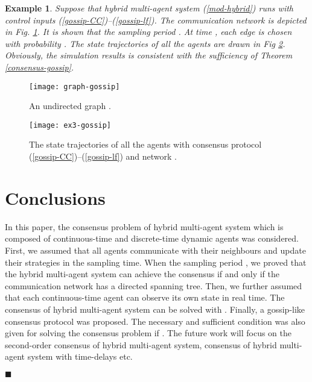 \documentclass[12pt,draftcls,onecolumn]{IEEEtran}
\newtheorem{example}{Example}
\newcommand*{\QEDA}{\hfill\ensuremath{\blacksquare}}
\begin{document}
\begin{example}\label{ex3}
Suppose that hybrid multi-agent system (\ref{mod-hybrid}) runs with control inputs (\ref{gossip-CC})--(\ref{gossip-lf}). The communication network is depicted in Fig. \ref{graph-ex3}. It is shown that the sampling period . At time , each edge  is chosen with probability . The state trajectories of all the agents are drawn in Fig \ref{result-ex3}. Obviously, the simulation results is consistent with  the sufficiency of Theorem \ref{consensus-gossip}.
\end{example}

\begin{figure}[htbp]
  \centering
\texttt{[image: graph-gossip]}\\
  \caption{An undirected graph .}\label{graph-ex3}
\end{figure}

\begin{figure}[htbp]
  \centering
\texttt{[image: ex3-gossip]}\\
  \caption{The state trajectories of all the agents with consensus protocol (\ref{gossip-CC})--(\ref{gossip-lf}) and network .}\label{result-ex3}
\end{figure}


\section{Conclusions}\label{s-Conclusion}

In this paper, the consensus problem of hybrid multi-agent system which is composed of continuous-time and discrete-time dynamic agents was considered. First, we assumed that  all agents communicate with their neighbours and update their strategies in the sampling time. When the sampling period , we proved that the hybrid multi-agent system can achieve the consensus if and only if the communication network has a directed spanning tree. Then, we further assumed that each continuous-time agent can observe its own state in real time. The consensus of hybrid multi-agent system can be solved with . Finally, a gossip-like consensus protocol was proposed. The necessary and sufficient condition was also given for solving the consensus problem if . The future work will focus on the second-order consensus of hybrid multi-agent system, consensus of hybrid multi-agent system with time-delays etc.

\QEDA
\end{document}
